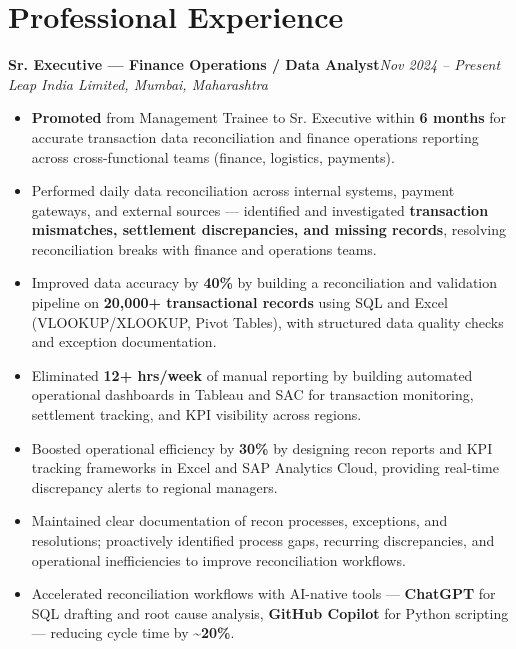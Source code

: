 \documentclass[10pt, letterpaper]{article}
\newcommand{\role}[3]{%
  \vspace{2pt}%
  {\bfseries #1}\hfill{\small\color{muted}\textit{#3}}\\[-2pt]%
  {\small\color{muted}\textit{#2}}%
}
\begin{document}
\section{Professional Experience}

\role{Sr. Executive — Finance Operations / Data Analyst}{Leap India Limited, Mumbai, Maharashtra}{Nov 2024 – Present}

\begin{itemize}
  \item \textbf{Promoted} from Management Trainee to Sr. Executive within \textbf{6 months} for accurate transaction data reconciliation and finance operations reporting across cross-functional teams (finance, logistics, payments).
  \item Performed daily data reconciliation across internal systems, payment gateways, and external sources — identified and investigated \textbf{transaction mismatches, settlement discrepancies, and missing records}, resolving reconciliation breaks with finance and operations teams.
  \item Improved data accuracy by \textbf{40\%} by building a reconciliation and validation pipeline on \textbf{20,000+ transactional records} using SQL and Excel (VLOOKUP/XLOOKUP, Pivot Tables), with structured data quality checks and exception documentation.
  \item Eliminated \textbf{12+ hrs/week} of manual reporting by building automated operational dashboards in Tableau and SAC for transaction monitoring, settlement tracking, and KPI visibility across regions.
  \item Boosted operational efficiency by \textbf{30\%} by designing recon reports and KPI tracking frameworks in Excel and SAP Analytics Cloud, providing real-time discrepancy alerts to regional managers.
  \item Maintained clear documentation of recon processes, exceptions, and resolutions; proactively identified process gaps, recurring discrepancies, and operational inefficiencies to improve reconciliation workflows.
  \item Accelerated reconciliation workflows with AI-native tools — \textbf{ChatGPT} for SQL drafting and root cause analysis, \textbf{GitHub Copilot} for Python scripting — reducing cycle time by \textbf{\textasciitilde20\%}.
\end{itemize}

\vspace{1pt}
\end{document}
